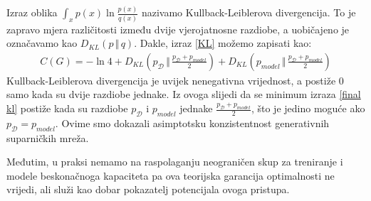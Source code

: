 Izraz oblika $\int_{x} p(x) \ln \frac{p(x)}{q(x)}$ nazivamo Kullback-Leiblerova divergencija. To je zapravo mjera različitosti između dvije vjerojatnosne razdiobe, a uobičajeno je označavamo kao $D_{KL}(p \, \Vert \, q)$. Dakle, 
izraz \ref{KL} možemo zapisati kao:
\begin{align}
C(G) = -\ln 4 + D_{KL}(p_{\mathcal{D}} \, \Vert \, \frac{p_{\mathcal{D}} + p_{model}}{2}) + D_{KL}(p_{model} \, \Vert \, \frac{p_{\mathcal{D}} + p_{model}}{2}) \label{final kl}
\end{align}
Kullback-Leiblerova divergencija je uvijek nenegativna vrijednost, a postiže 0 samo kada su dvije razdiobe jednake. Iz ovoga slijedi da se minimum izraza \ref{final kl} postiže kada su razdiobe $p_{\mathcal{D}}$ i $p_{model}$ jednake $\frac{p_{\mathcal{D}} + p_{model}}{2}$, što je jedino moguće ako $p_{\mathcal{D}} = p_{model}$. Ovime smo dokazali asimptotsku konzistentnost generativnih suparničkih mreža.

Međutim, u praksi nemamo na raspolaganju neograničen skup za treniranje i modele beskonačnoga kapaciteta pa ova teorijska garancija optimalnosti ne vrijedi, ali služi kao dobar pokazatelj potencijala ovoga pristupa.